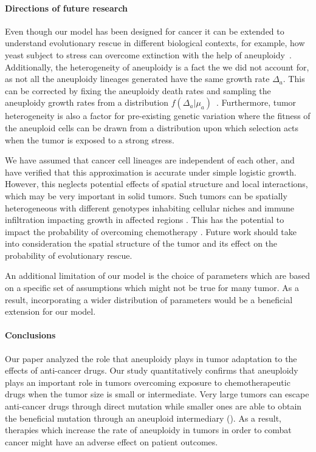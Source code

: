 \documentclass[12pt]{extarticle}
\begin{document}
\paragraph{Directions of future research}
Even though our model has been designed for cancer it can be extended to understand evolutionary rescue in different biological contexts, for example, how yeast subject to stress can overcome extinction with the help of aneuploidy~\citep{pompei2023fitness}. Additionally, the heterogeneity of aneuploidy is a fact the we did not account for, as not all the aneuploidy lineages generated have the same growth rate $\Delta_a$. This can be corrected by  fixing the aneuploidy death rates and sampling the aneuploidy growth rates from a distribution $f\left(\Delta_a|\mu_a\right)$~\citet{martin2013probability}. Furthermore, tumor heterogeneity is also a factor for pre-existing genetic variation where the fitness of the aneuploid cells can be drawn from a distribution upon which selection acts when the tumor is exposed to a strong stress.

We have assumed that cancer cell lineages are independent of each other,
and have verified that this approximation is accurate under simple logistic growth. 
However, this neglects potential effects of spatial structure and local interactions, which may be very important in solid tumors.
Such tumors can be spatially heterogeneous with different genotypes inhabiting cellular niches and immune infiltration impacting growth in affected regions \citep{varrone2023cellcharter,galon2010immune}. This has the potential to impact the probability of overcoming chemotherapy \citep{martens2011spatial}. Future work should take into consideration the spatial structure of the tumor and its effect on the probability of evolutionary rescue.

An additional limitation of our model is the choice of parameters which are based on a specific set of assumptions which might not be true for many tumor. As a result, incorporating a wider distribution of parameters would be a beneficial extension for our model.

\paragraph{Conclusions}

Our paper analyzed the role that aneuploidy plays in tumor adaptation to the effects of anti-cancer drugs. Our study quantitatively confirms that aneuploidy plays an important role in tumors overcoming exposure to chemotherapeutic drugs when the tumor size is small or intermediate. Very large tumors can escape anti-cancer drugs through direct mutation while smaller ones are able to obtain the beneficial mutation through an aneuploid intermediary (). As a result, therapies which increase the rate of aneuploidy in tumors in order to combat cancer might have an adverse effect on patient outcomes.
\end{document}
